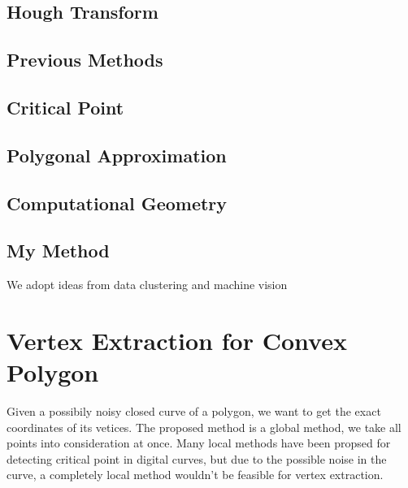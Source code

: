 \documentclass{article}
\begin{document}
\subsection{Hough Transform}
\label{sub:Hough Transform}

\subsection{Previous Methods}
\label{sub:Previous Methods}

\subsection{Critical Point}
\label{sub:Critical Point}

\subsection{Polygonal Approximation}
\label{sub:polygon}

\subsection{Computational Geometry}
\label{sub:Computational Geometry}

\subsection{My Method}
\label{sub:My Method}

We adopt ideas from data clustering and machine vision

\section{Vertex Extraction for Convex Polygon}
\label{sec:Vertex Extraction for Convex Polygon}
Given a possibily noisy closed curve of a polygon, we want to get the exact
coordinates of its vetices. The proposed method is a global method, we take
all points into consideration at once. Many local methods have been propsed
for detecting critical point in digital curves, but due to the possible noise in the curve,
a completely local method wouldn't be feasible for vertex extraction.
\end{document}
